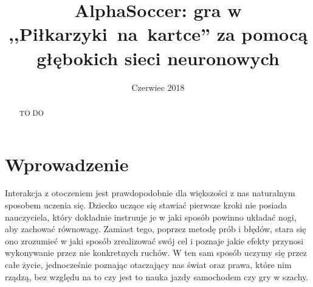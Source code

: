 \documentclass[licencjacka]{pracamgr}
\title{AlphaSoccer: gra w ,,Piłkarzyki~na~kartce'' za pomocą głębokich sieci neuronowych}
\date{Czerwiec 2018}
\begin{document}
\maketitle

\begin{abstract}
  TO DO
\end{abstract}

\tableofcontents

\chapter{Wprowadzenie}\label{r:intro}




Interakcja z otoczeniem jest prawdopodobnie dla większości z nas naturalnym sposobem uczenia się. 
Dziecko uczące się stawiać pierwsze kroki nie posiada nauczyciela, który dokładnie instruuje je w jaki sposób powinno układać nogi, aby zachować równowagę. 
Zamiast tego, poprzez metodę prób i błędów, stara się ono zrozumieć w jaki sposób zrealizować swój cel i poznaje jakie efekty przynosi wykonywanie przez nie konkretnych ruchów. 
W ten sam sposób uczymy się przez całe życie, jednocześnie poznając otaczający nas świat oraz prawa, które nim rządzą, bez względu na to czy jest to nauka jazdy samochodem czy gry w szachy.
\end{document}
